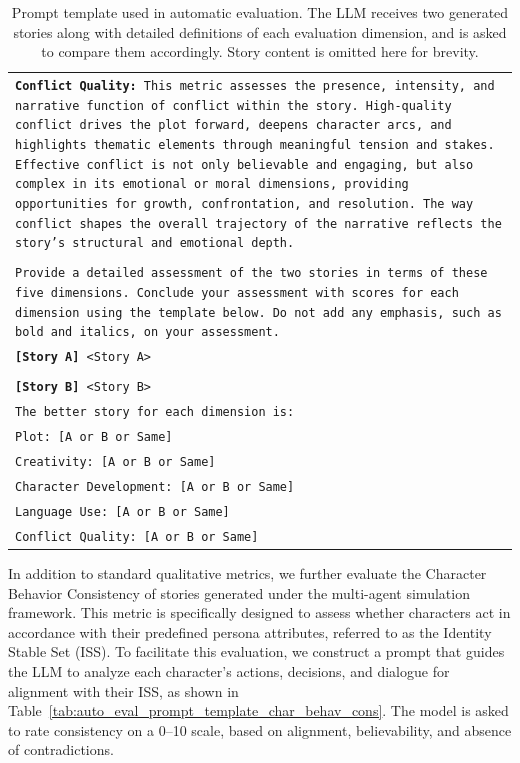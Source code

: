 \documentclass[letterpaper]{article} %
\begin{document}
\begin{table}[]
\begin{tabularx}{\textwidth}{X}
    \texttt{\textbf{Conflict Quality:} This metric assesses the presence, intensity, and narrative function of conflict within the story. High-quality conflict drives the plot forward, deepens character arcs, and highlights thematic elements through meaningful tension and stakes. Effective conflict is not only believable and engaging, but also complex in its emotional or moral dimensions, providing opportunities for growth, confrontation, and resolution. The way conflict shapes the overall trajectory of the narrative reflects the story's structural and emotional depth.} \\\\

    \texttt{Provide a detailed assessment of the two stories in terms of these five dimensions. Conclude your assessment with scores for each dimension using the template below. Do not add any emphasis, such as bold and italics, on your assessment.} \\

    \midrule
    \midrule
    \texttt{\textbf{[Story A]} <Story A>} \\\\
    \texttt{\textbf{[Story B]} <Story B>} \\
    
    \midrule
    \midrule
    \texttt{The better story for each dimension is:} \\
    \texttt{Plot: [A or B or Same]} \\
    \texttt{Creativity: [A or B or Same]} \\
    \texttt{Character Development: [A or B or Same]} \\
    \texttt{Language Use: [A or B or Same]} \\
    \texttt{Conflict Quality: [A or B or Same]} \\

    \bottomrule
  \end{tabularx}
  \caption{Prompt template used in automatic evaluation. The LLM receives two generated stories along with detailed definitions of each evaluation dimension, and is asked to compare them accordingly. Story content is omitted here for brevity.}
  \label{tab:auto_eval_prompt_template}
\end{table}

In addition to standard qualitative metrics, we further evaluate the Character Behavior Consistency of stories generated under the multi-agent simulation framework. This metric is specifically designed to assess whether characters act in accordance with their predefined persona attributes, referred to as the Identity Stable Set (ISS). To facilitate this evaluation, we construct a prompt that guides the LLM to analyze each character's actions, decisions, and dialogue for alignment with their ISS, as shown in Table~\ref{tab:auto_eval_prompt_template_char_behav_cons}. The model is asked to rate consistency on a 0–10 scale, based on alignment, believability, and absence of contradictions.
\end{document}
